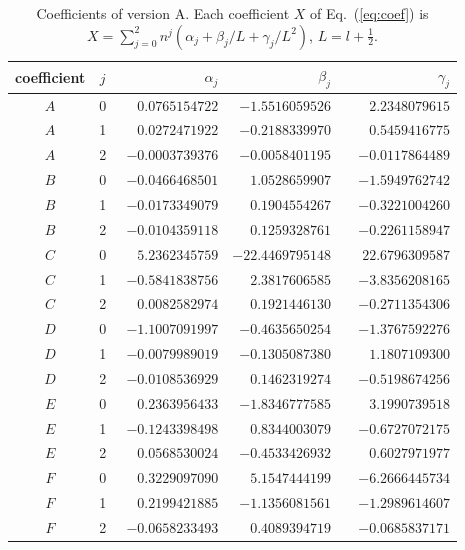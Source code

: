 \begin{table}[t]\centering\footnotesize
\caption{Coefficients of version A. Each coefficient $X$ of Eq.~(\ref{eq:coef}) is $X=\sum_{j=0}^{2} n^j(\alpha_j+\beta_j/L+\gamma_j/L^2)$, $L=l+\tfrac12$.}
\label{tab:coefA}
\begin{tabular}{cc rrr}\hline\hline
coefficient & $j$ & $\alpha_j$ & $\beta_j$ & $\gamma_j$ \\ \hline
$A$ & 0 & $\phantom{-}0.0765154722$ & $-1.5516059526$ & $\phantom{-}2.2348079615$ \\
$A$ & 1 & $\phantom{-}0.0272471922$ & $-0.2188339970$ & $\phantom{-}0.5459416775$ \\
$A$ & 2 & $-0.0003739376$ & $-0.0058401195$ & $-0.0117864489$ \\
$B$ & 0 & $-0.0466468501$ & $\phantom{-}1.0528659907$ & $-1.5949762742$ \\
$B$ & 1 & $-0.0173349079$ & $\phantom{-}0.1904554267$ & $-0.3221004260$ \\
$B$ & 2 & $-0.0104359118$ & $\phantom{-}0.1259328761$ & $-0.2261158947$ \\
$C$ & 0 & $\phantom{-}5.2362345759$ & $-22.4469795148$ & $\phantom{-}22.6796309587$ \\
$C$ & 1 & $-0.5841838756$ & $\phantom{-}2.3817606585$ & $-3.8356208165$ \\
$C$ & 2 & $\phantom{-}0.0082582974$ & $\phantom{-}0.1921446130$ & $-0.2711354306$ \\
\hline
$D$ & 0 & $-1.1007091997$ & $-0.4635650254$ & $-1.3767592276$ \\
$D$ & 1 & $-0.0079989019$ & $-0.1305087380$ & $\phantom{-}1.1807109300$ \\
$D$ & 2 & $-0.0108536929$ & $\phantom{-}0.1462319274$ & $-0.5198674256$ \\
$E$ & 0 & $\phantom{-}0.2363956433$ & $-1.8346777585$ & $\phantom{-}3.1990739518$ \\
$E$ & 1 & $-0.1243398498$ & $\phantom{-}0.8344003079$ & $-0.6727072175$ \\
$E$ & 2 & $\phantom{-}0.0568530024$ & $-0.4533426932$ & $\phantom{-}0.6027971977$ \\
$F$ & 0 & $\phantom{-}0.3229097090$ & $\phantom{-}5.1547444199$ & $-6.2666445734$ \\
$F$ & 1 & $\phantom{-}0.2199421885$ & $-1.1356081561$ & $-1.2989614607$ \\
$F$ & 2 & $-0.0658233493$ & $\phantom{-}0.4089394719$ & $-0.0685837171$ \\
\hline
\hline\end{tabular}\end{table}
